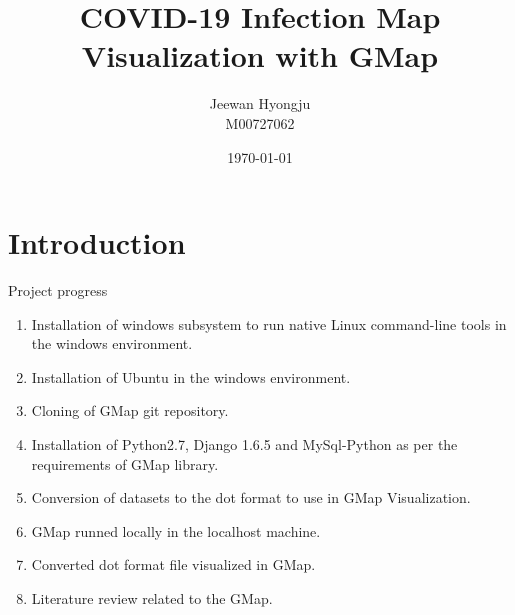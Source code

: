 \documentclass[12pt]{article}
\title{COVID-19 Infection Map Visualization with GMap}
\author{Jeewan Hyongju\\M00727062}
\date{\today}
\begin{document}
\maketitle

\section*{Introduction}

Project progress
\begin{enumerate}
  \item Installation of windows subsystem to run native Linux command-line tools in the windows environment.
  \item Installation of Ubuntu in the windows environment.
  \item Cloning of GMap git repository.
  \item Installation of Python2.7, Django 1.6.5 and MySql-Python as per the requirements of GMap library. 
  \item Conversion of datasets to the dot format to use in GMap Visualization.
  \item GMap runned locally in the localhost machine.
  \item Converted dot format file visualized in GMap.
  \item Literature review related to the GMap.

\end{enumerate}
\end{document}
